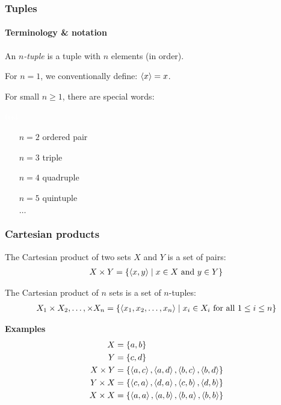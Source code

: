 \documentclass[fleqn,10pt,serif,xcolor=svgnames,xcolor=table,aspectratio=169]{beamer}
\begin{document}
\begin{frame}
  \frametitle{Tuples}
  \framesubtitle{Terminology \& notation}

  An \textit{$n$-tuple} is a tuple with $n$ elements (in order).


  For $n=1$, we conventionally define: $\left \langle x\right\rangle = x$.

  For small $n \ge 1$, there are special words:

  \medskip

  \begin{minipage}{0.15\linewidth}
    \textcolor{white}{test}
  \end{minipage}
  \begin{minipage}{0.4\linewidth}
    \begin{itemize}
      \item[$n=2$] ordered pair
      \item[$n=3$] triple
      \item[$n=4$] quadruple
      \item[$n=5$] quintuple
      \item[] $\dots$
    \end{itemize}
  \end{minipage}
\end{frame}

\begin{frame}
  \frametitle{Cartesian products}

  The Cartesian product of two sets $X$ and $Y$ is a set of pairs:
  \begin{align*}
    X \times Y = \left\{\left \langle x,y\right\rangle \mid x \in X \text{ and } y \in Y\right\}
  \end{align*}

  \bigskip \pause

  The Cartesian product of $n$ sets is a set of $n$-tuples:
  \begin{align*}
    X_{1} \times X_{2}, \dots, \times X_{n} = \left\{\left \langle x_{1},x_{2}, \dots, x_{n}\right\rangle \mid x_{i} \in X_{i} \text{ for all } 1 \le i \le n\right\}
  \end{align*}


  \bigskip \pause

  {\textbf{{\color{themecolor}Examples}}}
  \begin{align*}
    X &= \left\{a,b\right\} \\
    Y &= \left\{c,d\right\} \\
    X \times Y & = \left\{\left \langle a,c\right\rangle, \left \langle a,d\right\rangle, \left \langle b,c\right\rangle, \left \langle b,d\right\rangle\right\} \\
    Y \times X & = \left\{\left \langle c,a\right\rangle, \left \langle d,a\right\rangle, \left \langle c,b\right\rangle, \left \langle d,b\right\rangle\right\} \\
    X \times X & = \left\{\left \langle a,a\right\rangle, \left \langle a,b\right\rangle, \left \langle b,a\right\rangle, \left \langle b,b\right\rangle\right\} \\
  \end{align*}

\end{frame}
\end{document}
